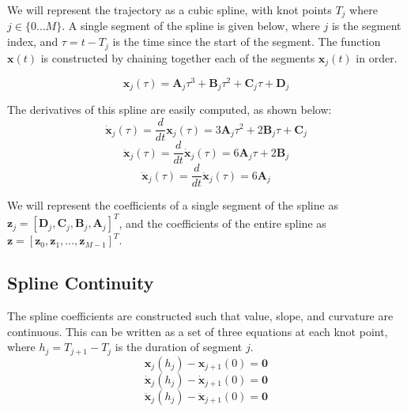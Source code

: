 We will represent the trajectory as a cubic spline, with knot points $T_j$ where $j \in \{ 0 \dots M\}$.
A single segment of the spline is given below,
where $j$ is the segment index, and
$\tau = t - T_j$ is the time since the start of the segment.
The function $\bm{x}(t)$ is constructed by chaining together each of the segments $\bm{x}_j(t)$ in order.

\begin{equation}
  \bm{x}_j(\tau) = \bm{A}_j \tau^3 + \bm{B}_j \tau^2 + \bm{C}_j \tau + \bm{D}_j
\end{equation}

The derivatives of this spline are easily computed, as shown below:
\begin{equation}
  \dot{\bm{x}}_j(\tau)
    = \frac{d}{dt} \bm{x}_j(\tau)
    = 3 \bm{A}_j \tau^2 + 2 \bm{B}_j \tau + \bm{C}_j
\end{equation}
\begin{equation}
  \ddot{\bm{x}}_j(\tau)
    = \frac{d}{dt} \dot{\bm{x}}_j(\tau)
    = 6 \bm{A}_j \tau + 2 \bm{B}_j
\end{equation}
\begin{equation}
  \dddot{\bm{x}}_j(\tau)
    = \frac{d}{dt} \ddot{\bm{x}}_j(\tau)
    = 6 \bm{A}_j
\end{equation}

We will represent the coefficients of a single segment of the spline as
$\bm{z}_j = [\bm{D}_j, \bm{C}_j, \bm{B}_j, \bm{A}_j]^T$,
and the coefficients of the entire spline as
$\bm{z} = [\bm{z}_0, \bm{z}_1, \dots, \bm{z}_{M-1}]^T$.


\subsection{Spline Continuity}

The spline coefficients are constructed such that value, slope, and curvature are continuous.
This can be written as a set of three equations at each knot point, where
$h_j = T_{j+1} - T_j$ is the duration of segment $j$.
\begin{equation}
  \bm{x}_j(h_j) - \bm{x}_{j+1}(0) = \bm{0}
\end{equation}
\begin{equation}
  \dot{\bm{x}}_j(h_j) - \dot{\bm{x}}_{j+1}(0) = \bm{0}
\end{equation}
\begin{equation}
  \ddot{\bm{x}}_j(h_j) - \ddot{\bm{x}}_{j+1}(0) = \bm{0}
\end{equation}

